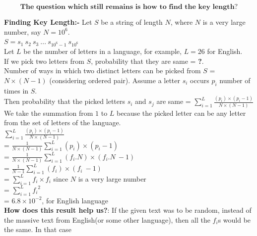 \documentclass[a4paper]{article}
\begin{document}
\[
 \boxed{\textbf{The\ question\ which\ still\ remains\ is\ how\ to\ find\ the\ key\ length?}}
 \]
 
\textbf{{\large Finding Key Length:-}} Let $S$ be a string of length $N$, where $N$ is a very large number, say $N = 10^6$. \\

$S = s_1\ s_2\ s_3\ ...\ s_{10^6-1}\ s_{10^6}$\\

Let $L$ be the number of letters in a language, for example, $L=26$ for English. \\

If we pick two letters from $S$, probability that they are same = \textbf{?}. \\

Number of ways in which two distinct letters can be picked from $S$ = $N \times (N-1)$ (considering ordered pair). Assume a letter $s_i$ occurs $p_i$ number of times in $S$. \\

Then probability that the picked letters $s_i$ and $s_j$ are same = $\sum_{i=1}^L \frac{(p_i) \times (p_i - 1)}{ N \times (N-1)}$ \\

We take the summation from $1$ to $L$ because the picked letter can be any letter from the set of letters of the language. \\

$\sum_{i=1}^L \frac{(p_i) \times (p_i - 1)}{ N \times (N-1)}$\\

= $ \frac{1}{ N \times (N-1)}\sum_{i=1}^L (p_i) \times (p_i - 1)$\\

= $ \frac{1}{ N \times (N-1)}\sum_{i=1}^L (f_i.N) \times (f_i.N\ - 1)$\\

= $ \frac{1}{N-1}\sum_{i=1}^L (f_i) \times (f_i\ - 1)$\\

= $\sum_{i=1}^L f_i \times f_i$		\hspace{5mm} since $N$ is a very large number\\

= $\sum_{i=1}^L {f_i}^2$\\

= $6.8 \times {10}^{-2}$, for English language\\

\textbf{How does this result help us?}: If the given text was to be random, instead of the massive text from English(or some other language), then all the $f_i$s would be the same. In that case\\	
\end{document}
